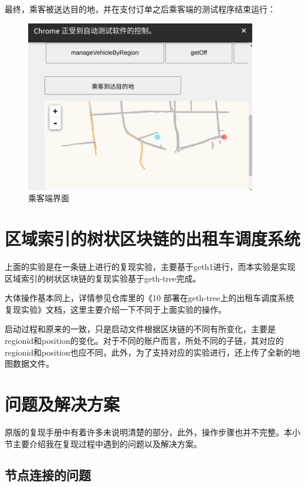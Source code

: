 最终，乘客被送达目的地，并在支付订单之后乘客端的测试程序结束运行：

\begin{figure}
	\centering
	\includegraphics[width=0.9\textwidth]{figures/乘客端界面.png}
	\caption{乘客端界面}
	\label{fig:乘客端界面}
\end{figure}

\section{区域索引的树状区块链的出租车调度系统}

上面的实验是在一条链上进行的复现实验，主要基于geth1进行，而本实验是实现区域索引的树状区块链的复现实验基于geth-tree完成。
	
大体操作基本同上，详情参见仓库里的《10 部署在geth-tree上的出租车调度系统复现实验》文档，这里主要介绍一下不同于上面实验的操作。

启动过程和原来的一致，只是启动文件根据区块链的不同有所变化，主要是regionid和position的变化。对于不同的账户而言，所处不同的子链，其对应的regionid和position也应不同，此外，为了支持对应的实验进行，还上传了全新的地图数据文件。

\section{问题及解决方案}

原版的复现手册中有着许多未说明清楚的部分，此外，操作步骤也并不完整。本小节主要介绍我在复现过程中遇到的问题以及解决方案。

\subsection{节点连接的问题}

